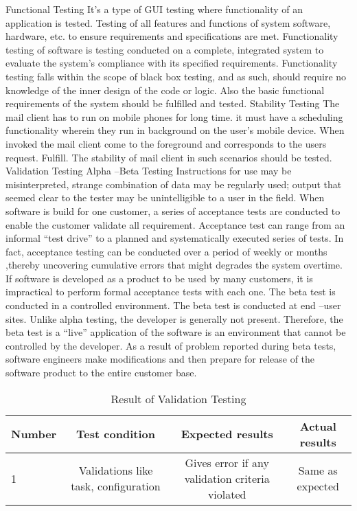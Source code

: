  Functional Testing 
	It's a type of GUI testing where functionality of an application is tested. Testing of all features and functions of system software, hardware, etc. to ensure requirements and specifications are met. Functionality testing of software is testing conducted on a complete, integrated system to evaluate the system's compliance with its specified requirements. Functionality testing falls within the scope of black box testing, and as such, should require no knowledge of the inner design of the code or logic. Also the basic functional requirements of the system should be fulfilled and tested.
Stability Testing
The mail client has to run on mobile phones for long time. it must have a scheduling functionality wherein they run in background on the user’s mobile device. When invoked the mail client come to the foreground and corresponds to the users request. Fulfill. The stability of mail client in such scenarios should be tested.
Validation Testing
Alpha –Beta Testing 
         Instructions for use may be misinterpreted, strange combination of data may be regularly used; output that seemed clear to the tester may be unintelligible to a user in the field. When software is build for one customer, a series of acceptance tests are conducted to enable the customer validate all requirement.
Acceptance test can range from an informal “test drive” to a planned and systematically executed series of tests. In fact, acceptance testing can be conducted over a period of weekly or months ,thereby uncovering cumulative errors that might degrades the system overtime. If software is developed as a product to be used by many customers, it is impractical to perform formal acceptance tests with each one.
          The beta test is conducted in a controlled environment. The beta test is conducted at end –user sites. Unlike alpha testing, the developer is generally not present. Therefore, the beta test is a “live” application of the software is an environment that cannot be controlled by the developer. As a result of problem reported during beta tests, software engineers make modifications and then prepare for release of the software product to the entire customer base.




\begin{table}[h]
\centering
\begin{tabular}{|l|c|c|c|} \hline 
Number & Test condition  & Expected results &	Actual results\\
\hline
1 & Validations like task, configuration & Gives error if any validation criteria violated &	Same as expected\\
\hline
\end{tabular} 
\caption{Result of Validation Testing}
\end{table}


